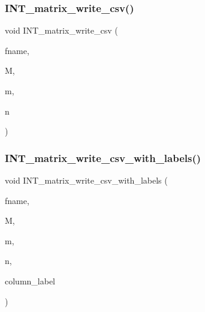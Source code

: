 \subsubsection{\texorpdfstring{I\+N\+T\+\_\+matrix\+\_\+write\+\_\+csv()}{INT\_matrix\_write\_csv()}}
{\footnotesize\ttfamily void I\+N\+T\+\_\+matrix\+\_\+write\+\_\+csv (\begin{DoxyParamCaption}\item[{const \mbox{\hyperlink{galois_8h_ab6cc7b4aeb6ea31aba2b3fbfc83ff5e6}{B\+Y\+TE}} $\ast$}]{fname,  }\item[{\mbox{\hyperlink{galois_8h_a09fddde158a3a20bd2dcadb609de11dc}{I\+NT}} $\ast$}]{M,  }\item[{\mbox{\hyperlink{galois_8h_a09fddde158a3a20bd2dcadb609de11dc}{I\+NT}}}]{m,  }\item[{\mbox{\hyperlink{galois_8h_a09fddde158a3a20bd2dcadb609de11dc}{I\+NT}}}]{n }\end{DoxyParamCaption})}

\mbox{\label{util_8_c_a0391196b8acb0da63b9978f05b3f3b49}} 
\subsubsection{\texorpdfstring{I\+N\+T\+\_\+matrix\+\_\+write\+\_\+csv\+\_\+with\+\_\+labels()}{INT\_matrix\_write\_csv\_with\_labels()}}
{\footnotesize\ttfamily void I\+N\+T\+\_\+matrix\+\_\+write\+\_\+csv\+\_\+with\+\_\+labels (\begin{DoxyParamCaption}\item[{const \mbox{\hyperlink{galois_8h_ab6cc7b4aeb6ea31aba2b3fbfc83ff5e6}{B\+Y\+TE}} $\ast$}]{fname,  }\item[{\mbox{\hyperlink{galois_8h_a09fddde158a3a20bd2dcadb609de11dc}{I\+NT}} $\ast$}]{M,  }\item[{\mbox{\hyperlink{galois_8h_a09fddde158a3a20bd2dcadb609de11dc}{I\+NT}}}]{m,  }\item[{\mbox{\hyperlink{galois_8h_a09fddde158a3a20bd2dcadb609de11dc}{I\+NT}}}]{n,  }\item[{const \mbox{\hyperlink{galois_8h_ab6cc7b4aeb6ea31aba2b3fbfc83ff5e6}{B\+Y\+TE}} $\ast$$\ast$}]{column\+\_\+label }\end{DoxyParamCaption})}

